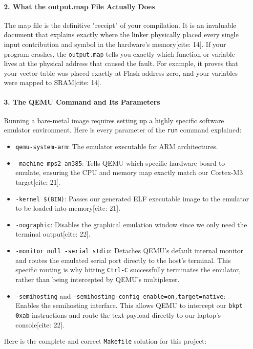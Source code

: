 \paragraph{2. What the output.map File Actually Does}
The map file is the definitive "receipt" of your compilation. It is an invaluable document that explains exactly where the linker physically placed every single input contribution and symbol in the hardware's memory[cite: 14]. If your program crashes, the \texttt{output.map} tells you exactly which function or variable lives at the physical address that caused the fault. For example, it proves that your vector table was placed exactly at Flash address zero, and your variables were mapped to SRAM[cite: 14].

\paragraph{3. The QEMU Command and Its Parameters}
Running a bare-metal image requires setting up a highly specific software emulator environment. Here is every parameter of the \texttt{run} command explained:
\begin{itemize}
    \item \texttt{qemu-system-arm}: The emulator executable for ARM architectures.
    \item \texttt{-machine mps2-an385}: Tells QEMU which specific hardware board to emulate, ensuring the CPU and memory map exactly match our Cortex-M3 target[cite: 21].
    \item \texttt{-kernel \$(BIN)}: Passes our generated ELF executable image to the emulator to be loaded into memory[cite: 21].
    \item \texttt{-nographic}: Disables the graphical emulation window since we only need the terminal output[cite: 22].
    \item \texttt{-monitor null -serial stdio}: Detaches QEMU's default internal monitor and routes the emulated serial port directly to the host's terminal. This specific routing is why hitting \texttt{Ctrl-C} successfully terminates the emulator, rather than being intercepted by QEMU's multiplexer.
    \item \texttt{-semihosting} and \texttt{--semihosting-config enable=on,target=native}: Enables the semihosting interface. This allows QEMU to intercept our \texttt{bkpt 0xab} instructions and route the text payload directly to our laptop's console[cite: 22].
\end{itemize}

Here is the complete and correct \texttt{Makefile} solution for this project:

